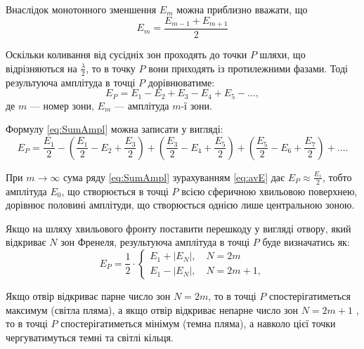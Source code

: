 Внаслідок монотонного зменшення $ E_m $ можна приблизно вважати, що
\begin{equation}\label{eq:avE}
    E_m = \frac{E_{m - 1} + E_{m + 1}}{2}
\end{equation}

Оскільки коливання від сусідніх зон проходять до точки $ P $ шляхи, що відрізняються на $ \frac\lambda2 $, то в точку $ P $
вони приходять із протилежними фазами. Тоді
результуюча амплітуда в точці $ P $ дорівнюватиме:
\begin{equation}\label{eq:SumAmpl}
    E_P = E_1 - E_2 + E_3 - E_4 + E_5 - \ldots,
\end{equation}
де $ m $ --- номер зони, $ E_m $ --- амплітуда $ m $-ї зони.


Формулу \eqref{eq:SumAmpl} можна записати у вигляді:
\begin{equation*}
    E_P = \frac{E_1}{2} - \left(\frac{E_1}{2} - E_2 + \frac{E_3}{2} \right) +   \left(\frac{E_3}{2} - E_4 + \frac{E_5}{2} \right) +  \left(\frac{E_5}{2} - E_6 + \frac{E_7}{2} \right)  + \ldots.
\end{equation*}

При $ m \to \infty $ сума ряду \eqref{eq:SumAmpl} зурахуванням \eqref{eq:avE} дає $ E_P \approx \frac{E_1}{2} $, тобто амплітуда $ E_0 $, що створюється в точці $ P $ всією сферичною хвильовою поверхнею, дорівнює половині амплітуди, що створюється однією лише центральною зоною.

Якщо на шляху хвильового фронту поставити перешкоду у вигляді отвору, який відкриває $N$ зон Френеля, результуюча амплітуда в точці $P$ буде визначатись як:
\begin{equation}\label{eq:Amplitide_of_holes}
    E_P =\frac12\cdot
    \begin{cases}
        E_1 + |E_N|, \quad N = 2m \\
        E_1 - |E_N|, \quad N = 2m+1,
    \end{cases}
\end{equation}

Якщо отвір відкриває парне число зон $N = 2m$, то в точці $P$ спостерігатиметься максимум (світла пляма), а якщо отвір відкриває непарне число зон  $N = 2m + 1$ , то в точці $P$ спостерігатиметься мінімум (темна пляма), а навколо цієї точки чергуватимуться темні та світлі кільця.


